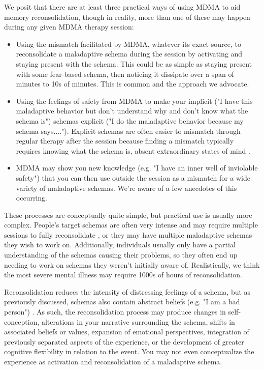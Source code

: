 \documentclass[12pt,letterpaper]{book}
\begin{document}
We posit that there are at least three practical ways of using MDMA to aid memory reconsolidation, though in reality, more than one of these may happen during any given MDMA therapy session:
\begin{itemize}
	\item Using the mismatch facilitated by MDMA, whatever its exact source, to reconsolidate a maladaptive schema during the session by activating and staying present with the schema. This could be as simple as staying present with some fear-based schema, then noticing it dissipate over a span of minutes to 10s of minutes. This is common and the approach we advocate.
	\item Using the feelings of safety from MDMA to make your implicit ("I have this maladaptive behavior but don't understand why and don't know what the schema is") schemas explicit ("I do the maladaptive behavior because my schema says...."). Explicit schemas are often easier to mismatch through regular therapy after the session because finding a mismatch typically requires knowing what the schema is, absent extraordinary states of mind \cite{eckerUnlocking}.%
	\item MDMA may show you new knowledge (e.g. "I have an inner well of inviolable safety") that you can then use outside the session as a mismatch for a wide variety of maladaptive schemas. We're aware of a few anecdotes of this occurring.
\end{itemize}
These processes are conceptually quite simple, but practical use is usually more complex. People's target schemas are often very intense and may require multiple sessions to fully reconsolidate \cite{mitchellMDMAClinicalTrial}, or they may have multiple maladaptive schemas they wish to work on. Additionally, individuals usually only have a partial understanding of the schemas causing their problems, so they often end up needing to work on schemas they weren't initially aware of. Realistically, we think the most severe mental illness may require 1000s of hours of reconsolidation.

Reconsolidation reduces the intensity of distressing feelings of a schema, but as previously discussed, schemas also contain abstract beliefs (e.g. "I am a bad person") \cite{laneReconsolidation}. As such, the reconsolidation process may produce changes in self-conception, alterations in your narrative surrounding the schema, shifts in associated beliefs or values, expansion of emotional perspectives, integration of previously separated aspects of the experience, or the development of greater cognitive flexibility in relation to the event. You may not even conceptualize the experience as activation and reconsolidation of a maladaptive schema.
\end{document}
